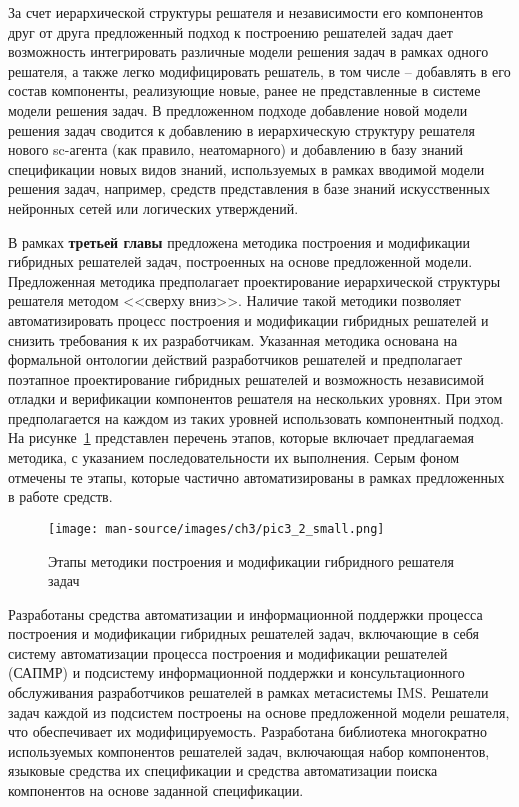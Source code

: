 \documentclass{thesisby}
\begin{document}
\vspace{-3mm}

За счет иерархической структуры решателя и независимости его компонентов друг от друга предложенный подход к построению решателей задач дает возможность интегрировать различные модели решения задач в рамках одного решателя, а также легко модифицировать решатель, в том числе -- добавлять в его состав компоненты, реализующие новые, ранее не представленные в системе модели решения задач. В предложенном подходе добавление новой модели решения задач сводится к добавлению в иерархическую структуру решателя нового sc-агента (как правило, неатомарного) и добавлению в базу знаний спецификации новых видов знаний, используемых в рамках вводимой модели решения задач, например, средств представления в базе знаний искусственных нейронных сетей или логических утверждений.

В рамках \textbf{третьей главы} предложена методика построения и модификации гибридных решателей задач, построенных на основе предложенной модели. Предложенная методика предполагает проектирование иерархической структуры решателя методом <<сверху вниз>>. Наличие такой методики позволяет автоматизировать процесс построения и модификации гибридных решателей и снизить требования к их разработчикам. Указанная методика основана на формальной онтологии действий разработчиков решателей и предполагает поэтапное проектирование гибридных решателей и возможность независимой отладки и верификации компонентов решателя на нескольких уровнях. При этом предполагается на каждом из таких уровней использовать компонентный подход. На рисунке~\ref{fig:pic3_2} представлен перечень этапов, которые включает предлагаемая методика, с указанием последовательности их выполнения. Серым фоном отмечены те этапы, которые частично автоматизированы в рамках предложенных в работе средств.

\begin{figure}[H]
    \centering
    \texttt{[image: man-source/images/ch3/pic3\_2\_small.png]}
    \caption{Этапы методики построения и модификации гибридного решателя задач}
    \label{fig:pic3_2}
\end{figure}

\vspace{-3mm}

Разработаны средства автоматизации и информационной поддержки процесса построения и модификации гибридных решателей задач, включающие в себя систему автоматизации процесса построения и модификации решателей (САПМР) и подсистему информационной поддержки и консультационного обслуживания разработчиков решателей в рамках метасистемы IMS. Решатели задач каждой из подсистем построены на основе предложенной модели решателя, что обеспечивает их модифицируемость. Разработана библиотека многократно используемых компонентов решателей задач, включающая набор компонентов, языковые средства их спецификации и средства автоматизации поиска компонентов на основе заданной спецификации.
\end{document}
